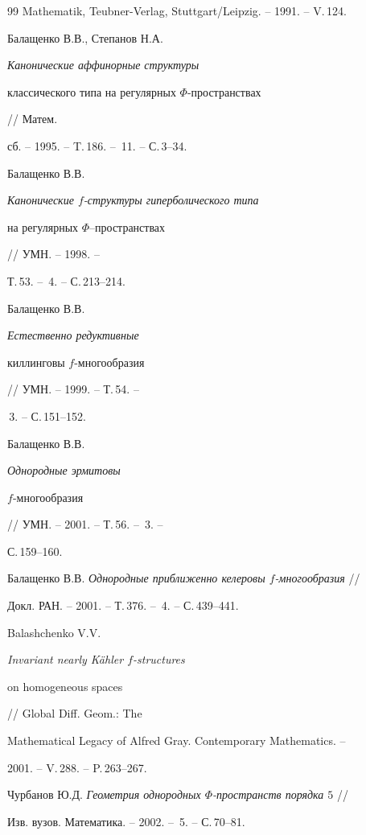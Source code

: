 \begin{thebibliography}{99}
Mathematik, Teubner-Verlag, Stuttgart/Leipzig. -- 1991. -- V.\,124.





 Балащенко В.В., Степанов Н.А. {\it Канонические аффинорные структуры


классического типа на регулярных $\Phi$-пространствах} // Матем.


сб. -- 1995. -- T.\,186. -- \No\,11. -- С.\,3--34.





 Балащенко В.В. {\it Канонические $f$-структуры гиперболического типа


на регулярных $\Phi$--пространствах} // УМН. -- 1998. --


Т.\,53. -- \No\,4. -- С.\,213--214.





 Балащенко В.В. {\it Естественно редуктивные


киллинговы $f$-многообразия} // УМН. -- 1999. -- Т.\,54. --


\No\,3. -- С.\,151--152.





 Балащенко В.В. {\it Однородные эрмитовы


$f$-многообразия} // УМН. -- 2001. -- Т.\,56. -- \No\,3. --


С.\,159--160.





 Балащенко В.В. {\it Однородные приближенно келеровы $f$-многообразия} //


Докл. РАН. -- 2001. -- Т.\,376. -- \No\,4. -- С.\,439--441.





 Balashchenko V.V. {\it Invariant nearly K\"ahler $f$-structures


on homogeneous spaces} // Global Diff. Geom.: The


Mathematical Legacy of Alfred Gray. Contemporary Mathematics. --


2001. -- V.\,288. -- P.\,263--267.





 Чурбанов Ю.Д. {\it Геометрия однородных $\Phi$-пространств порядка $5$} //


Изв. вузов. Математика. -- 2002. -- \No\,5. -- С.\,70--81.






\end{thebibliography}
